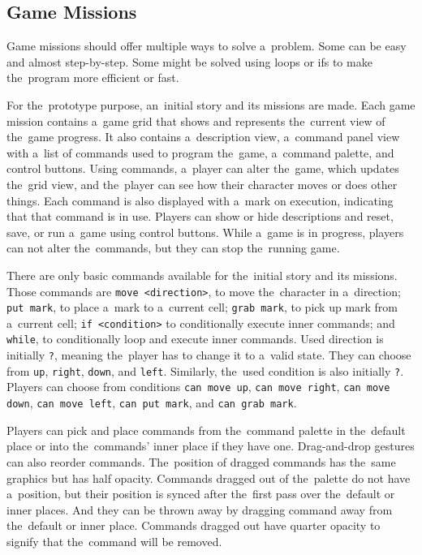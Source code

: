 \subsection{Game Missions}
\label{analysis:game:game-missions}

Game missions should offer multiple ways to solve a~problem.
Some can be easy and almost step-by-step.
Some might be solved using loops or ifs to make the~program more efficient or fast.

For the~prototype purpose, an~initial story and its missions are made.
Each game mission contains a~game grid that shows and represents the~current view of the~game progress.
It also contains a~description view, a~command panel view with a~list of commands used to program the~game, a~command palette, and control buttons.
Using commands, a~player can alter the~game, which updates the~grid view, and the~player can see how their character moves or does other things.
Each command is also displayed with a~mark on execution, indicating that that command is in use.
Players can show or hide descriptions and reset, save, or run a~game using control buttons.
While a~game is in progress, players can not alter the~commands, but they can stop the~running game. 

There are only basic commands available for the~initial story and its missions.
Those commands are \texttt{move <direction>}, to move the~character in a~direction; \texttt{put mark}, to place a~mark to a~current cell; \texttt{grab mark}, to pick up mark from a~current cell; \texttt{if <condition>} to conditionally execute inner commands; and \texttt{while}, to conditionally loop and execute inner commands.
Used direction is initially \texttt{?}, meaning the~player has to change it to a~valid state.
They can choose from \texttt{up}, \texttt{right}, \texttt{down}, and \texttt{left}.
Similarly, the~used condition is also initially \texttt{?}.
Players can choose from conditions \texttt{can move up}, \texttt{can move right}, \texttt{can move down}, \texttt{can move left}, \texttt{can put mark}, and \texttt{can grab mark}.

Players can pick and place commands from the~command palette in the~default place or into the~commands' inner place if they have one.
Drag-and-drop gestures can also reorder commands.
The~position of dragged commands has the~same graphics but has half opacity.
Commands dragged out of the~palette do not have a~position, but their position is synced after the~first pass over the~default or inner places.
And they can be thrown away by dragging command away from the~default or inner place.
Commands dragged out have quarter opacity to signify that the~command will be removed.

